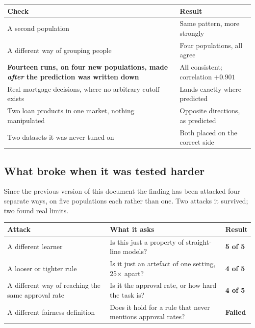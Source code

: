 \documentclass[11pt,a4paper]{article}
\begin{document}
\begin{center}
\small
\begin{tabularx}{\linewidth}{lX}
\toprule
\textbf{Check} & \textbf{Result} \\
\midrule
A second population & Same pattern, more strongly \\
A different way of grouping people & Four populations, all agree \\
\textbf{Fourteen runs, on four new populations, made \emph{after} the prediction was written down} &
  All consistent; correlation $+0.901$ \\
Real mortgage decisions, where no arbitrary cutoff exists & Lands exactly where predicted \\
Two loan products in one market, nothing manipulated & Opposite directions, as predicted \\
Two datasets it was never tuned on & Both placed on the correct side \\
\bottomrule
\end{tabularx}
\end{center}

\subsection{What broke when it was tested harder}

Since the previous version of this document the finding has been attacked four separate
ways, on five populations each rather than one. Two attacks it survived; two found real
limits.

\begin{center}
\small
\begin{tabularx}{\linewidth}{lXl}
\toprule
\textbf{Attack} & \textbf{What it asks} & \textbf{Result} \\
\midrule
A different learner &
  Is this just a property of straight-line models? & \textbf{5 of 5} \\
A looser or tighter rule &
  Is it just an artefact of one setting, 25$\times$ apart? & \textbf{4 of 5} \\
A different way of reaching the same approval rate &
  Is it the approval rate, or how hard the task is? & \textbf{4 of 5} \\
A different fairness definition &
  Does it hold for a rule that never mentions approval rates? & \textbf{Failed} \\
\bottomrule
\end{tabularx}
\end{center}
\end{document}

